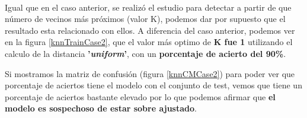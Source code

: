 \paragraph{}
Igual que en el caso anterior, se realizó el estudio para detectar a partir de que número de vecinos más próximos (valor K), podemos dar por supuesto que el resultado esta relacionado con ellos. A diferencia del caso anterior, podemos ver en la figura \ref{knnTrainCase2}, que el valor más optimo de \textbf{K fue 1} utilizando el calculo de la distancia \textbf{'\textit{uniform}'}, con un \textbf{porcentaje de acierto del 90\%}.

Si mostramos la matriz de confusión\cite{ref:confusion_matrix} (figura \ref{knnCMCase2}) para poder ver que porcentaje de aciertos tiene el modelo con el conjunto de test, vemos que tiene un porcentaje de aciertos bastante elevado por lo que podemos afirmar que \textbf{el modelo es sospechoso de estar sobre ajustado\cite{ref:knn_overfiting}}.

